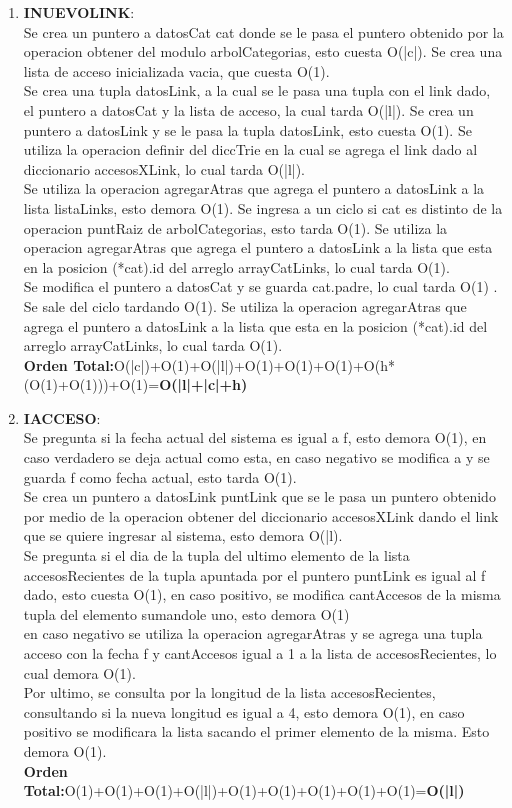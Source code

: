 \documentclass[10pt, a4paper]{article}
\begin{document}
\begin{enumerate}
     \item \textbf{INUEVOLINK}:\\Se crea un puntero a datosCat cat donde se le pasa el puntero obtenido por la operacion obtener del modulo arbolCategorias, esto cuesta O(|c|). Se crea una lista de acceso  inicializada vacia, que cuesta O(1).\\
Se crea una tupla datosLink, a la cual se le pasa una tupla con el link dado, el puntero a datosCat y la lista de acceso, la cual tarda O(|l|). Se crea un puntero a datosLink y se le pasa la tupla datosLink, esto cuesta O(1).  Se utiliza la operacion definir del diccTrie en la cual se agrega el link dado al diccionario accesosXLink, lo cual tarda O(|l|).\\
Se utiliza la operacion agregarAtras que agrega el puntero a datosLink a la lista listaLinks, esto demora O(1).  Se ingresa a un ciclo si cat es distinto de la operacion puntRaiz de arbolCategorias, esto tarda O(1). Se utiliza la operacion agregarAtras que agrega el puntero a datosLink a la lista que esta en la posicion (*cat).id del arreglo arrayCatLinks, lo cual tarda O(1).\\
Se modifica el puntero a datosCat y se guarda cat.padre, lo cual tarda O(1) . Se sale del ciclo tardando O(1). Se utiliza la operacion agregarAtras que agrega el puntero a datosLink a la lista que esta en la posicion (*cat).id del arreglo arrayCatLinks, lo cual tarda O(1).\\
\textbf{Orden Total:}O(|c|)+O(1)+O(|l|)+O(1)+O(1)+O(1)+O(h*(O(1)+O(1)))+O(1)=\textbf{O(|l|+|c|+h)}


     \item \textbf{IACCESO}:\\ Se pregunta si la fecha actual del sistema es igual a f, esto demora O(1), en caso verdadero se deja actual como esta, en caso negativo se modifica a y se guarda f como fecha actual, esto tarda O(1).\\
Se crea un puntero a datosLink puntLink que se le pasa un puntero obtenido por medio de la operacion obtener del diccionario accesosXLink dando el link que se quiere ingresar al sistema, esto demora O(|l). \\
Se pregunta si el dia de la tupla del ultimo elemento de la lista accesosRecientes de la tupla apuntada por el puntero puntLink es igual al f dado, esto cuesta O(1), en caso positivo, se modifica cantAccesos de la misma tupla del elemento sumandole uno, esto demora O(1) \\
en caso negativo se utiliza la operacion agregarAtras y se agrega una tupla acceso con la fecha f y cantAccesos igual a 1 a la lista de accesosRecientes, lo cual demora O(1). \\
Por ultimo, se consulta por la longitud de la lista accesosRecientes, consultando si la nueva longitud es igual a 4, esto demora O(1), en caso positivo se modificara la lista sacando el primer elemento de la misma. Esto demora O(1).\\
\textbf{Orden Total:}O(1)+O(1)+O(1)+O(|l|)+O(1)+O(1)+O(1)+O(1)+O(1)=\textbf{O(|l|)}


\end{enumerate}
\end{document}

